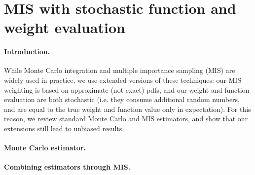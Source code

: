 \section{MIS with stochastic function and weight evaluation}
\label{sec:layeredbsdf:weight_computation}

\paragraph{Introduction.}

While Monte	Carlo integration and multiple importance sampling (MIS) are widely used in practice, we use extended versions of these techniques: our MIS weighting is based on approximate (not exact) pdfs, and our weight and function evaluation are both stochastic (i.e. they consume additional random numbers, and are  equal to the true weight and function value only in expectation). For this reason, we review standard Monte Carlo and MIS estimators, and show that our extensions still lead to unbiased results.


\paragraph{Monte Carlo estimator.}

%
%
%
%
%
%


\paragraph{Combining estimators through MIS.}

